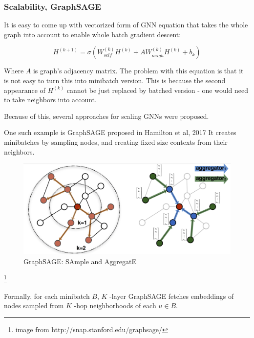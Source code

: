 \documentclass[longabstract,mgr,english]{iithesis}
\begin{document}
\subsubsection{Scalability, GraphSAGE}

It is easy to come up with vectorized form of GNN equation that takes the whole graph into account to enable whole batch gradient descent:

    $$H^{(k+1)} = \sigma(W^{(k)}_{self} H^{(k)} + A W^{(k)}_{neigh} H^{(k)} + b_k)$$


Where \(A\) is graph's adjacency matrix. The problem with this equation is that it is not easy to turn this into minibatch version.
This is because the second appearance of \(H^{(k)}\) cannot be just replaced by batched version - one would need to
take neighbors into account.

Because of this, several approaches for scaling GNNs were proposed.

One such example is GraphSAGE proposed in Hamilton et al, 2017 \cite{graphsage} It creates minibatches by sampling nodes,
and creating fixed size contexts from their neighbors. 


\begin{figure}[htbp]
\centering
\includegraphics[width=.9\linewidth]{./img/sage_pool.png}
\caption{GraphSAGE: SAmple and AggregatE}
\end{figure}

\footnote{image from http://snap.stanford.edu/graphsage/} 

Formally, for each minibatch \(B\), \(K\) -layer GraphSAGE fetches embeddings of nodes sampled from \(K\) -hop neighborhoods of each \(u \in B\).
\end{document}
